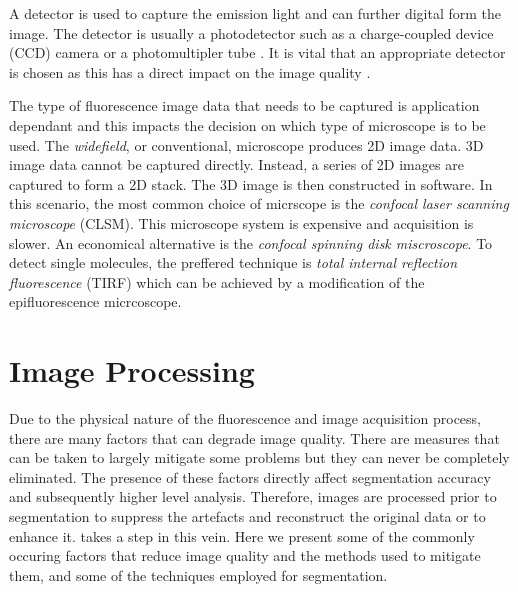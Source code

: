 \begin{definition}[Detector]
	A detector is used to capture the emission light and can further digital form the image.
	The detector is usually a photodetector such as a charge-coupled device (CCD) camera or a photomultipler tube \citep{Danek2012,Hubeny2008,LichtmanConchello2005,Spring2003,Murphy2001}.
	It is vital that an appropriate detector is chosen as this has a direct impact on the image quality \citep{Fatima2008}.
\end{definition}

The type of fluorescence image data that needs to be captured is application dependant and this impacts the decision on which type of microscope is to be used.
The \textit{widefield}, or conventional, microscope produces 2D image data.
3D image data cannot be captured directly.
Instead, a series of 2D images are captured to form a 2D stack. The 3D image is then constructed in software.
In this scenario, the most common choice of micrscope is the \textit{confocal laser scanning microscope} (CLSM).
This microscope system is expensive and acquisition is slower.
An economical alternative is the \textit{confocal spinning disk miscroscope}.
To detect single molecules, the preffered technique is \textit{total internal reflection fluorescence} (TIRF) which can be achieved by a modification of the epifluorescence micrcoscope.


\section{Image Processing}
\label{sec:ImageProcessing}

Due to the physical nature of the fluorescence and image acquisition process, there are many factors that can degrade image quality.
There are measures that can be taken to largely mitigate some problems but they can never be completely eliminated.
The presence of these factors directly affect segmentation accuracy and subsequently higher level analysis.
Therefore, images are processed prior to segmentation to suppress the artefacts and reconstruct the original data \citep{Danek2012} or to enhance it.
 takes a step in this vein.
Here we present some of the commonly occuring factors that reduce image quality and the methods used to mitigate them, and some of the techniques employed for segmentation.

